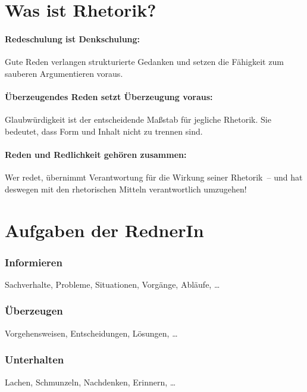 \section{Was ist Rhetorik?}
\paragraph*{Redeschulung ist Denkschulung:} Gute Reden verlangen strukturierte Gedanken und setzen die Fähigkeit zum sauberen Argumentieren voraus.
\paragraph*{Überzeugendes Reden setzt Überzeugung voraus:} Glaubwürdigkeit ist der entscheidende Maßstab für jegliche Rhetorik. Sie bedeutet, dass Form und Inhalt nicht zu trennen sind.
\paragraph*{Reden und Redlichkeit gehören zusammen:} Wer redet, übernimmt Verantwortung für die Wirkung seiner Rhetorik~-- und hat deswegen mit den rhetorischen Mitteln verantwortlich umzugehen!

\section{Aufgaben der RednerIn}
\subsubsection{Informieren}
Sachverhalte, Probleme, Situationen, Vorgänge, Abläufe, \ldots

\subsubsection{Überzeugen}
Vorgehensweisen, Entscheidungen, Lösungen, \ldots

\subsubsection{Unterhalten}
Lachen, Schmunzeln, Nachdenken, Erinnern, \ldots
